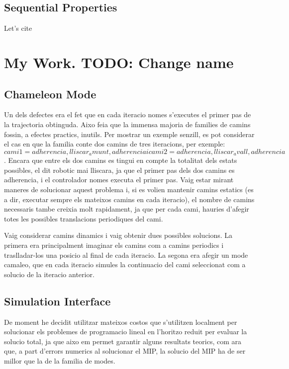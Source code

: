 \documentclass[12,twoside]{TFG-GM}
\theoremstyle{definition}
\theoremstyle{remark}
\begin{document}
\subsection{Sequential Properties}
\label{subsec:sequential}
Let's cite \cite{seq}


\section{My Work. TODO: Change name}
\label{sec:work}

\subsection{Chameleon Mode}
\label{subsec:karmachameleon}
Un dels defectes era el fet que en cada iteracio nomes s'executes el primer pas de la trajectoria obtinguda. Aixo feia que la immensa majoria de families de camins fossin, a efectes practics, inutils. Per mostrar un exemple senzill, es pot considerar el cas en que la familia conte dos camins de tres iteracions, per exemple:
$$cami1 = {adherencia, lliscar_amunt, adherencia} i cami2 = {adherencia, lliscar_avall, adherencia}$$. Encara que entre els dos camins es tingui en compte la totalitat dels estats possibles, el dit robotic mai lliscara, ja que el primer pas dels dos camins es adherencia, i el controlador nomes executa el primer pas. Vaig estar mirant maneres de solucionar aquest problema i, si es volien mantenir camins estatics (es a dir, executar sempre els mateixos camins en cada iteracio), el nombre de camins necessaris tambe creixia molt rapidament, ja que per cada cami, hauries d'afegir totes les possibles translacions periodiques del cami.

Vaig considerar camins dinamics i vaig obtenir dues possibles solucions. La primera era principalment imaginar els camins com a camins periodics i traslladar-los una posicio al final de cada iteracio.
La segona era afegir un mode camaleo, que en cada iteracio simules la continuacio del cami seleccionat com a solucio de la iteracio anterior.

\subsection{Simulation Interface}
\label{subsec:sim}
De moment he decidit utilitzar mateixos costos que s'utilitzen localment per solucionar els problemes de programacio lineal en l'horitzo reduit per evaluar la solucio total, ja que aixo em permet garantir alguns resultats teorics, com ara que, a part d'errors numerics al solucionar el MIP, la solucio del MIP ha de ser millor que la de la familia de modes.
\end{document}
